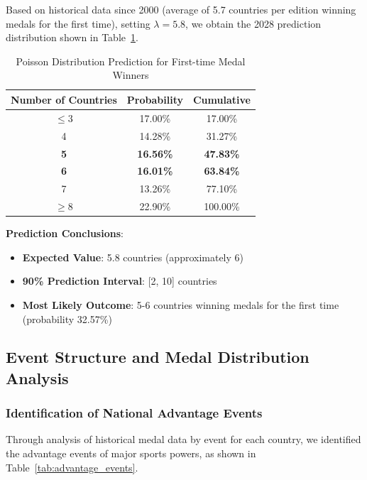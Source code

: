 \documentclass{mcmthesis}
\begin{document}
Based on historical data since 2000 (average of 5.7 countries per edition winning medals for the first time), setting $\lambda = 5.8$, we obtain the 2028 prediction distribution shown in Table~\ref{tab:poisson}.

\begin{table}[htbp]
\centering
\caption{Poisson Distribution Prediction for First-time Medal Winners}
\label{tab:poisson}
\begin{tabular}{ccc}
\toprule
\textbf{Number of Countries} & \textbf{Probability} & \textbf{Cumulative} \\
\midrule
$\leq 3$ & 17.00\% & 17.00\% \\
4 & 14.28\% & 31.27\% \\
\textbf{5} & \textbf{16.56\%} & \textbf{47.83\%} \\
\textbf{6} & \textbf{16.01\%} & \textbf{63.84\%} \\
7 & 13.26\% & 77.10\% \\
$\geq 8$ & 22.90\% & 100.00\% \\
\bottomrule
\end{tabular}
\end{table}

\textbf{Prediction Conclusions}:
\begin{itemize}
    \item \textbf{Expected Value}: 5.8 countries (approximately 6)
    \item \textbf{90\% Prediction Interval}: [2, 10] countries
    \item \textbf{Most Likely Outcome}: 5-6 countries winning medals for the first time (probability 32.57\%)
\end{itemize}

\subsection{Event Structure and Medal Distribution Analysis}

\subsubsection{Identification of National Advantage Events}

Through analysis of historical medal data by event for each country, we identified the advantage events of major sports powers, as shown in Table~\ref{tab:advantage_events}.
\end{document}
